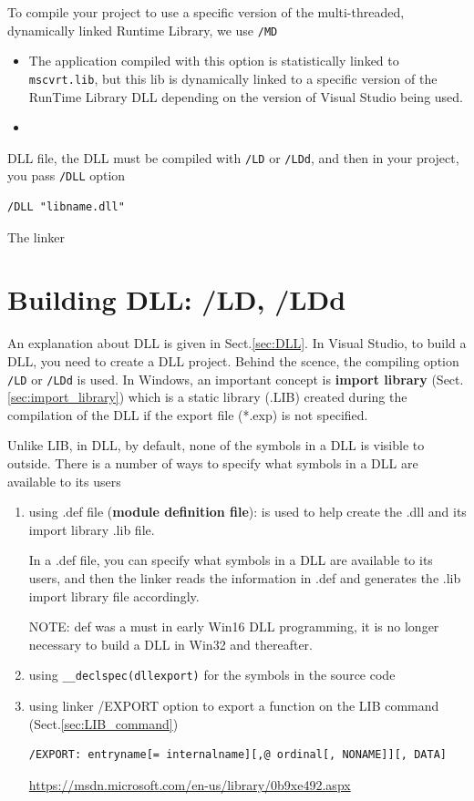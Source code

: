 To compile your project to use a specific version of the multi-threaded, dynamically linked 
Runtime Library, we use \verb!/MD!
\begin{itemize}
  \item The application compiled with this option is statistically linked to
  \verb!mscvrt.lib!, but this lib is dynamically linked to a specific version of
  the RunTime Library DLL depending on the version of Visual Studio being used. 

  \item 
\end{itemize}




DLL file, the DLL must be
compiled with \verb!/LD! or \verb!/LDd!, and then in your project, you pass
\verb!/DLL! option
\begin{verbatim}
/DLL "libname.dll"
\end{verbatim} 
The linker 

\section{Building DLL: /LD, /LDd }
\label{sec:building_DLL_/LD}

An explanation about DLL is given in Sect.\ref{sec:DLL}. In Visual Studio, to
build a DLL, you need to create a DLL project.
Behind the scence, the compiling option \verb!/LD! or \verb!/LDd! is used. In
Windows, an important concept is {\bf import library}
(Sect.\ref{sec:import_library}) which is a static library (.LIB) created during
the compilation of the DLL if the export file (*.exp) is not specified.


Unlike LIB, in DLL, by default, none of the symbols in a DLL is visible to
outside.  There is a number of ways to specify what symbols in a DLL are available to its users
\begin{enumerate}
  \item using .def file ({\bf module definition file}): is used to help create the .dll and
its import library .lib file.

In a .def file, you can specify what symbols in a DLL are available to its
users, and then the linker reads the information in .def and generates the .lib
import library file accordingly. 
  
NOTE: def was a must in early Win16 DLL programming, it is no longer necessary
to build a DLL in Win32 and thereafter.
  
   \item using \verb!__declspec(dllexport)! for the symbols in the source code
   
   \item using linker /EXPORT option to export a function on the LIB command (Sect.\ref{sec:LIB_command})
\begin{verbatim}
/EXPORT: entryname[= internalname][,@ ordinal[, NONAME]][, DATA]
\end{verbatim}   
\url{https://msdn.microsoft.com/en-us/library/0b9xe492.aspx}

\end{enumerate}

